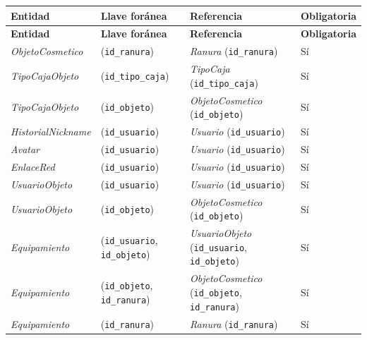 \begin{center}\small
\begin{longtable}{|L{0.21\textwidth}|L{0.26\textwidth}|L{0.29\textwidth}|L{0.12\textwidth}|}
\hline
\textbf{Entidad} & \textbf{Llave foránea} & \textbf{Referencia} & \textbf{Obligatoria} \\ \hline
\endfirsthead
\hline
\textbf{Entidad} & \textbf{Llave foránea} & \textbf{Referencia} & \textbf{Obligatoria} \\ \hline
\endhead
\textit{Objeto\-Cosmetico} & (\texttt{id\_\allowbreak{}ranura}) & \textit{Ranura} (\texttt{id\_\allowbreak{}ranura}) & Sí \\ \hline
\textit{Tipo\-Caja\-Objeto} & (\texttt{id\_\allowbreak{}tipo\_\allowbreak{}caja}) & \textit{Tipo\-Caja} (\texttt{id\_\allowbreak{}tipo\_\allowbreak{}caja}) & Sí \\ \hline
\textit{Tipo\-Caja\-Objeto} & (\texttt{id\_\allowbreak{}objeto}) & \textit{Objeto\-Cosmetico} (\texttt{id\_\allowbreak{}objeto}) & Sí \\ \hline
\textit{Historial\-Nickname} & (\texttt{id\_\allowbreak{}usuario}) & \textit{Usuario} (\texttt{id\_\allowbreak{}usuario}) & Sí \\ \hline
\textit{Avatar} & (\texttt{id\_\allowbreak{}usuario}) & \textit{Usuario} (\texttt{id\_\allowbreak{}usuario}) & Sí \\ \hline
\textit{Enlace\-Red} & (\texttt{id\_\allowbreak{}usuario}) & \textit{Usuario} (\texttt{id\_\allowbreak{}usuario}) & Sí \\ \hline
\textit{Usuario\-Objeto} & (\texttt{id\_\allowbreak{}usuario}) & \textit{Usuario} (\texttt{id\_\allowbreak{}usuario}) & Sí \\ \hline
\textit{Usuario\-Objeto} & (\texttt{id\_\allowbreak{}objeto}) & \textit{Objeto\-Cosmetico} (\texttt{id\_\allowbreak{}objeto}) & Sí \\ \hline
\textit{Equipamiento} & (\texttt{id\_\allowbreak{}usuario}, \texttt{id\_\allowbreak{}objeto}) & \textit{Usuario\-Objeto} (\texttt{id\_\allowbreak{}usuario}, \texttt{id\_\allowbreak{}objeto}) & Sí \\ \hline
\textit{Equipamiento} & (\texttt{id\_\allowbreak{}objeto}, \texttt{id\_\allowbreak{}ranura}) & \textit{Objeto\-Cosmetico} (\texttt{id\_\allowbreak{}objeto}, \texttt{id\_\allowbreak{}ranura}) & Sí \\ \hline
\textit{Equipamiento} & (\texttt{id\_\allowbreak{}ranura}) & \textit{Ranura} (\texttt{id\_\allowbreak{}ranura}) & Sí \\ \hline

\end{longtable}
\end{center}
